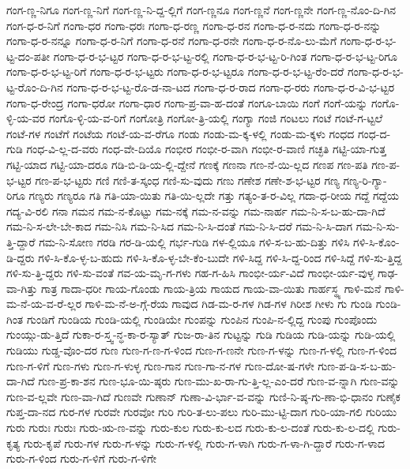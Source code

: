 {ಗಂಗ-ಣ್ಣ-ನಿಗೂ
ಗಂಗ-ಣ್ಣ-ನಿಗೆ
ಗಂಗ-ಣ್ಣ-ನಿ-ದ್ದ-ಲ್ಲಿಗೆ
ಗಂಗ-ಣ್ಣನೂ
ಗಂಗ-ಣ್ಣನೆ
ಗಂಗ-ಣ್ಣನೇ
ಗಂಗ-ಣ್ಣ-ನೊಂ-ದಿ-ಗಿನ
ಗಂಗ-ಧ-ರ-ನಿಗೆ
ಗಂಗಾ-ಧರ
ಗಂಗಾ-ಧರಃ
ಗಂಗಾ-ಧ-ರಣ್ಣ
ಗಂಗಾ-ಧ-ರನ
ಗಂಗಾ-ಧ-ರ-ನದು
ಗಂಗಾ-ಧ-ರ-ನನ್ನು
ಗಂಗಾ-ಧ-ರ-ನನ್ನೂ
ಗಂಗಾ-ಧ-ರ-ನಿಗೆ
ಗಂಗಾ-ಧ-ರನೆ
ಗಂಗಾ-ಧ-ರನೇ
ಗಂಗಾ-ಧ-ರ-ನೊ-ಲು-ಮೆಗೆ
ಗಂಗಾ-ಧ-ರ-ಭ-ಟ್ಟ-ದಂ-ಪತೀ
ಗಂಗಾ-ಧ-ರ-ಭ-ಟ್ಟರ
ಗಂಗಾ-ಧ-ರ-ಭ-ಟ್ಟ-ರಲ್ಲಿ
ಗಂಗಾ-ಧ-ರ-ಭ-ಟ್ಟ-ರಿ-ಗಿಂತ
ಗಂಗಾ-ಧ-ರ-ಭ-ಟ್ಟ-ರಿಗೂ
ಗಂಗಾ-ಧ-ರ-ಭ-ಟ್ಟ-ರಿಗೆ
ಗಂಗಾ-ಧ-ರ-ಭ-ಟ್ಟರು
ಗಂಗಾ-ಧ-ರ-ಭ-ಟ್ಟರೂ
ಗಂಗಾ-ಧ-ರ-ಭ-ಟ್ಟ-ರೆಂ-ದರೆ
ಗಂಗಾ-ಧ-ರ-ಭ-ಟ್ಟ-ರೊಂ-ದಿ-ಗಿನ
ಗಂಗಾ-ಧ-ರ-ಭ-ಟ್ಟ-ರೊ-ಡ-ನಾ-ಟದ
ಗಂಗಾ-ಧ-ರ-ರಾದ
ಗಂಗಾ-ಧ-ರರು
ಗಂಗಾ-ಧ-ರ-ವಿ-ಭ-ಟ್ಟರ
ಗಂಗಾ-ಧ-ರೇಂದ್ರ
ಗಂಗಾ-ಧರೋ
ಗಂಗಾ-ಧಾರ
ಗಂಗಾ-ಪ್ರ-ವಾ-ಹ-ದಂತೆ
ಗಂಗೂ-ಬಾಯಿ
ಗಂಗೆ
ಗಂಗೆ-ಯನ್ನು
ಗಂಗೊ-ಳ್ಳಿ-ಯ-ವರ
ಗಂಗೊ-ಳ್ಳಿ-ಯ-ವ-ರಿಗೆ
ಗಂಗೋತ್ರಿ
ಗಂಗೋ-ತ್ರಿ-ಯಲ್ಲಿ
ಗಂಗ್ಯಾ
ಗಂಜಿ
ಗಂಟಲು
ಗಂಟೆ
ಗಂಟೆ-ಗ-ಟ್ಟಲೆ
ಗಂಟೆ-ಗಳ
ಗಂಟೆಗೆ
ಗಂಟೆಯ
ಗಂಟೆ-ಯ-ವ-ರೆಗೂ
ಗಂಡು
ಗಂಡು-ಮ-ಕ್ಕ-ಳಲ್ಲಿ
ಗಂಡು-ಮ-ಕ್ಕಳು
ಗಂಧದ
ಗಂಧ-ದ-ಗುಡಿ
ಗಂಧ-ವಿ-ಲ್ಲ-ದ-ವರು
ಗಂಧ-ವೇ-ದಿಯೊ
ಗಂಭೀರ
ಗಂಭೀ-ರ-ವಾಗಿ
ಗಂಭೀ-ರ-ವಾಣಿ
ಗಚ್ಛತಿ
ಗಟ್ಟಿ-ಯಾ-ಗುತ್ತ
ಗಟ್ಟಿ-ಯಾದ
ಗಟ್ಟಿ-ಯಾ-ದರೂ
ಗಡಿ-ಬಿ-ಡಿ-ಯ-ಲ್ಲಿ-ದ್ದೇನೆ
ಗಣಕ್ಕೆ
ಗಣನಾ
ಗಣ-ನೆ-ಯಿ-ಲ್ಲದ
ಗಣಪ
ಗಣ-ಪತಿ
ಗಣ-ಪ-ಭ-ಟ್ಟರ
ಗಣ-ಪ-ಭ-ಟ್ಟರು
ಗಣಿ
ಗಣಿ-ತ-ಸ್ಕಂಧ
ಗಣಿ-ಸು-ವುದು
ಗಣು
ಗಣೇಶ
ಗಣೇ-ಶ-ಭ-ಟ್ಟರ
ಗಣ್ಯ
ಗಣ್ಯ-ರಿ-ಗ್ಯಾ-ರಿಗೂ
ಗಣ್ಯರು
ಗಣ್ಯರೂ
ಗತಿ
ಗತಿ-ಯಾ-ಯಿತು
ಗತಿ-ಯಿ-ಲ್ಲದೇ
ಗತ್ತು
ಗತ್ಯಂ-ತ-ರ-ವಿಲ್ಲ
ಗದಾ-ಧ-ರೀಯ
ಗದ್ದೆ
ಗದ್ದೆಯ
ಗದ್ಯ-ವಿ-ರಲಿ
ಗನಾ
ಗಮನ
ಗಮ-ನ-ಕೊಟ್ಟು
ಗಮ-ನಕ್ಕೆ
ಗಮ-ನ-ವನ್ನು
ಗಮ-ನಾರ್ಹ
ಗಮ-ನಿ-ಸ-ಬ-ಹು-ದಾ-ಗಿದೆ
ಗಮ-ನಿ-ಸ-ಲೇ-ಬೇ-ಕಾದ
ಗಮ-ನಿಸಿ
ಗಮ-ನಿ-ಸಿದ
ಗಮ-ನಿ-ಸಿ-ದಂತೆ
ಗಮ-ನಿ-ಸಿ-ದರೆ
ಗಮ-ನಿ-ಸಿ-ದಾಗ
ಗಮ-ನಿ-ಸು-ತ್ತಿ-ದ್ದಾರೆ
ಗಮ-ನಿ-ಸೋಣ
ಗರಡಿ
ಗರ-ಡಿ-ಯಲ್ಲಿ
ಗರ್ಭ-ಗುಡಿ
ಗಳ-ಲ್ಲಿಯೂ
ಗಳಿ-ಸ-ಬ-ಹು-ದಿತ್ತು
ಗಳಿಸಿ
ಗಳಿ-ಸಿ-ಕೊಂ-ಡಿ-ದ್ದರು
ಗಳಿ-ಸಿ-ಕೊ-ಳ್ಳ-ಬ-ಹುದು
ಗಳಿ-ಸಿ-ಕೊ-ಳ್ಳ-ಬೇ-ಕೆಂ-ಬುದೇ
ಗಳಿ-ಸಿದ್ದ
ಗಳಿ-ಸಿ-ದ್ದ-ರಿಂದ
ಗಳಿ-ಸಿದ್ದೆ
ಗಳಿ-ಸು-ತ್ತಿದ್ದ
ಗಳಿ-ಸು-ತ್ತಿ-ದ್ದರು
ಗಳಿ-ಸು-ವಂತೆ
ಗವ-ಯ-ಮೃ-ಗ-ಗಳು
ಗಹ-ಗ-ಹಿಸಿ
ಗಾಂಭೀ-ರ್ಯ-ವಿದೆ
ಗಾಂಭೀ-ರ್ಯ-ವುಳ್ಳ
ಗಾಢ-ವಾ-ಗಿತ್ತು
ಗಾತ್ರ
ಗಾದಾ-ಧರೀ
ಗಾಯ-ಗೊಂಡು
ಗಾಯ-ತ್ರಿಯ
ಗಾಯದ
ಗಾಯ-ವಾ-ಯಿತು
ಗಾರ್ಹಸ್ಥ್ಯ
ಗಾಳಿ-ಮನೆ
ಗಾಳಿ-ಮ-ನೆ-ಯ-ವ-ರೆ-ಲ್ಲರ
ಗಾಳಿ-ಮ-ನೆ-ಅ-ಗ್ಗೆ-ರೆಯ
ಗಾವುದ
ಗಿಡ-ಮ-ರ-ಗಳ
ಗಿಡ-ಗಳ
ಗಿರೀಶ
ಗೀಳು
ಗು
ಗುಂಡಿ
ಗುಂಡಿ-ಗಿಂತ
ಗುಂಡಿಗೆ
ಗುಂಡಿಯ
ಗುಂಡಿ-ಯಲ್ಲಿ
ಗುಂಡಿಯೇ
ಗುಂಪನ್ನು
ಗುಂಪಿನ
ಗುಂಪಿ-ನ-ಲ್ಲಿದ್ದ
ಗುಂಪು
ಗುಂಪೊಂದು
ಗುಂಯ್ಗು-ಡು-ತ್ತಿದೆ
ಗುಕಾ-ರ-ಸ್ತ್ವ-ನ್ಧ-ಕಾ-ರ-ಸ್ಯಾತ್
ಗುಜ-ರಾ-ತಿನ
ಗುಟ್ಟನ್ನು
ಗುಡಿ
ಗುಡಿಯ
ಗುಡಿ-ಯನ್ನು
ಗುಡಿ-ಯಲ್ಲಿ
ಗುಡಿಯು
ಗುಡ್ಡ-ವೊಂ-ದರ
ಗುಣ
ಗುಣ-ಗ-ಣ-ಗ-ಳಿಂದ
ಗುಣ-ಗ-ಣನೇ
ಗುಣ-ಗ-ಳನ್ನು
ಗುಣ-ಗ-ಳಲ್ಲಿ
ಗುಣ-ಗ-ಳಿಂದ
ಗುಣ-ಗ-ಳಿಗೆ
ಗುಣ-ಗಳು
ಗುಣ-ಗ-ಳುಳ್ಳ
ಗುಣ-ಗಾನ
ಗುಣ-ಗಾ-ನ-ಗಳ
ಗುಣ-ದೋ-ಷ-ಗಳೇ
ಗುಣ-ಪ-ಡಿ-ಸ-ಬ-ಹು-ದಾ-ಗಿದೆ
ಗುಣ-ಪ್ರ-ಕಾ-ಶನ
ಗುಣ-ಭೂ-ಯಿ-ಷ್ಠರು
ಗುಣ-ಮು-ಖ-ರಾ-ಗು-ತ್ತಿ-ಲ್ಲ-ಎಂ-ದರೆ
ಗುಣ-ವ-ನ್ನಾಗಿ
ಗುಣ-ವನ್ನು
ಗುಣ-ವ-ಲ್ಲವೇ
ಗುಣ-ವಾ-ಗಿದೆ
ಗುಣವೇ
ಗುಣಾನ್
ಗುಣಾ-ವಿ-ರ್ಭಾ-ವ-ವನ್ನು
ಗುಣಿ-ನಿ-ಷ್ಠ-ಗು-ಣಾ-ಭಿ-ಧಾನಂ
ಗುಣೈಕ
ಗುಪ್ತ-ದಾ-ನದ
ಗುರ-ಗಳ
ಗುರವೇ
ಗುರವೋ
ಗುರಿ
ಗುರಿ-ತ-ಲು-ಪಲು
ಗುರಿ-ಮು-ಟ್ಟಿ-ದಾಗ
ಗುರಿ-ಯಾ-ಗಲಿ
ಗುರಿಯು
ಗುರು
ಗುರುಃ
ಗುರುಃ
ಗುರು-ಋ-ಣ-ವನ್ನು
ಗುರು-ಕುಲ
ಗುರು-ಕು-ಲದ
ಗುರು-ಕು-ಲ-ದಂತೆ
ಗುರು-ಕು-ಲ-ದಲ್ಲಿ
ಗುರು-ಕೃತ್ಯ
ಗುರು-ಕೃಪೆ
ಗುರು-ಗಳ
ಗುರು-ಗ-ಳನ್ನು
ಗುರು-ಗ-ಳಲ್ಲಿ
ಗುರು-ಗ-ಳಾಗಿ
ಗುರು-ಗ-ಳಾ-ಗಿ-ದ್ದಾರೆ
ಗುರು-ಗ-ಳಾದ
ಗುರು-ಗ-ಳಿಂದ
ಗುರು-ಗ-ಳಿಗೆ
ಗುರು-ಗ-ಳಿಗೇ
}
